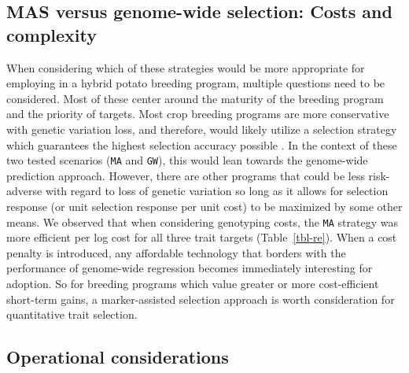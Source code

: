 \hypertarget{mas-versus-genome-wide-selection-costs-and-complexity}{%
\subsection{MAS versus genome-wide selection: Costs and
complexity}\label{mas-versus-genome-wide-selection-costs-and-complexity}}

When considering which of these strategies would be more appropriate for
employing in a hybrid potato breeding program, multiple questions need
to be considered. Most of these center around the maturity of the
breeding program and the priority of targets. Most crop breeding
programs are more conservative with genetic variation loss, and
therefore, would likely utilize a selection strategy which guarantees
the highest selection accuracy possible
\autocite{Swarup2021,Rasmusson1997}. In the context of these two tested
scenarios (\texttt{MA} and \texttt{GW}), this would lean towards the
genome-wide prediction approach. However, there are other programs that
could be less risk-adverse with regard to loss of genetic variation so
long as it allows for selection response (or unit selection response per
unit cost) to be maximized by some other means. We observed that when
considering genotyping costs, the \texttt{MA} strategy was more
efficient per log cost for all three trait targets (Table~\ref{tbl-re}).
When a cost penalty is introduced, any affordable technology that
borders with the performance of genome-wide regression becomes
immediately interesting for adoption. So for breeding programs which
value greater or more cost-efficient short-term gains, a marker-assisted
selection approach is worth consideration for quantitative trait
selection.

\hypertarget{operational-considerations}{%
\subsection{Operational
considerations}\label{operational-considerations}}

